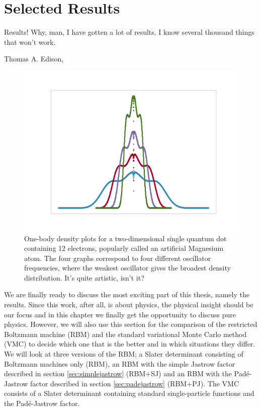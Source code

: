 \chapter{Selected Results} \label{chp:results}
\epigraph{Results! Why, man, I have gotten a lot of results. I know several thousand things that won't work.}{Thomas A. Edison, \cite{noauthor_edisonian_nodate}}
\begin{figure}[H]
	\centering
	\includegraphics[scale=0.6]{Images/art_white.png}
	\caption{One-body density plots for a two-dimensional single quantum dot containing 12 electrons, popularly called an artificial Magnesium atom. The four graphs correspond to four different oscillator frequencies, where the weakest oscillator gives the broadest density distribution. It's quite artistic, isn't it?}
\end{figure}

We are finally ready to discuss the most exciting part of this thesis, namely the results. Since this work, after all, is about physics, the physical insight should be our focus and in this chapter we finally get the opportunity to discuss pure physics. However, we will also use this section for the comparison of the restricted Boltzmann machine (RBM) and the standard variational Monte Carlo method (VMC) to decide which one that is the better and in which situations they differ. We will look at three versions of the RBM; a Slater determinant consisting of Boltzmann machines only (RBM), an RBM with the simple Jastrow factor described in section \ref{sec:simplejastrow} (RBM+SJ) and an RBM with the Padé-Jastrow factor described in section \ref{sec:padejastrow} (RBM+PJ). The VMC consists of a Slater determinant containing standard single-particle functions and the Padé-Jastrow factor. 

